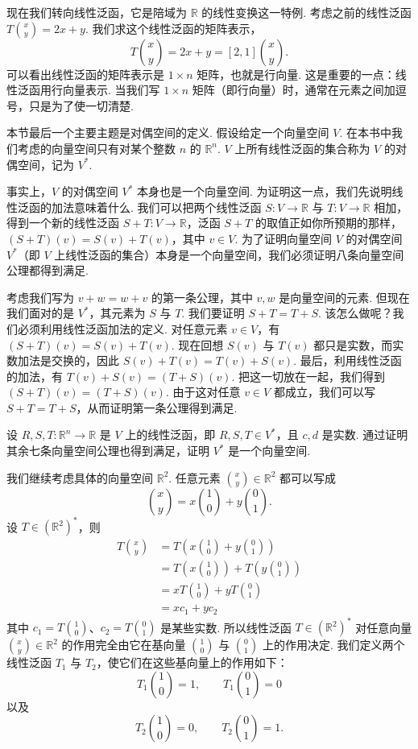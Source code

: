 现在我们转向线性泛函，它是陪域为 $\mathbb{R}$ 的线性变换这一特例. 考虑之前的线性泛函 $T\binom{x}{y}=2x+y$. 我们求这个线性泛函的矩阵表示，
\[
T\binom{x}{y}=2x+y=[2,1]\binom{x}{y}.
\]
可以看出线性泛函的矩阵表示是 $1\times n$ 矩阵，也就是行向量. 这是重要的一点：线性泛函用行向量表示. 当我们写 $1\times n$ 矩阵（即行向量）时，通常在元素之间加逗号，只是为了使一切清楚.

本节最后一个主要主题是对偶空间的定义. 假设给定一个向量空间 $V$. 在本书中我们考虑的向量空间只有对某个整数 $n$ 的 $\mathbb{R}^n$. $V$ 上所有线性泛函的集合称为 $V$ 的对偶空间，记为 $V^*$.

事实上，$V$ 的对偶空间 $V^*$ 本身也是一个向量空间. 为证明这一点，我们先说明线性泛函的加法意味着什么. 我们可以把两个线性泛函 $S:V\to\mathbb{R}$ 与 $T:V\to\mathbb{R}$ 相加，得到一个新的线性泛函 $S+T:V\to\mathbb{R}$，泛函 $S+T$ 的取值正如你所预期的那样，$(S+T)(v)=S(v)+T(v)$，其中 $v\in V$. 为了证明向量空间 $V$ 的对偶空间 $V^*$（即 $V$ 上线性泛函的集合）本身是一个向量空间，我们必须证明八条向量空间公理都得到满足.

考虑我们写为 $v+w=w+v$ 的第一条公理，其中 $v,w$ 是向量空间的元素. 但现在我们面对的是 $V^*$，其元素为 $S$ 与 $T$. 我们要证明 $S+T=T+S$. 该怎么做呢？我们必须利用线性泛函加法的定义. 对任意元素 $v\in V$，有 $(S+T)(v)=S(v)+T(v)$. 现在回想 $S(v)$ 与 $T(v)$ 都只是实数，而实数加法是交换的，因此 $S(v)+T(v)=T(v)+S(v)$. 最后，利用线性泛函的加法，有 $T(v)+S(v)=(T+S)(v)$. 把这一切放在一起，我们得到 $(S+T)(v)=(T+S)(v)$. 由于这对任意 $v\in V$ 都成立，我们可以写 $S+T=T+S$，从而证明第一条公理得到满足.

\begin{question}\label{q:1-7}
设 $R,S,T:\mathbb{R}^n\to\mathbb{R}$ 是 $V$ 上的线性泛函，即 $R,S,T\in V^*$，且 $c,d$ 是实数. 通过证明其余七条向量空间公理也得到满足，证明 $V^*$ 是一个向量空间.
\end{question}

我们继续考虑具体的向量空间 $\mathbb{R}^2$. 任意元素 $\binom{x}{y}\in\mathbb{R}^2$ 都可以写成
\[
\binom{x}{y}=x\binom{1}{0}+y\binom{0}{1}.
\]
设 $T\in(\mathbb{R}^2)^*$，则
\begin{align*}
T\binom{x}{y}
&=T\left(x\binom{1}{0}+y\binom{0}{1}\right)\\
&=T\left(x\binom{1}{0}\right)+T\left(y\binom{0}{1}\right)\\
&=xT\binom{1}{0}+yT\binom{0}{1}\\
&=xc_1+yc_2
\end{align*}
其中 $c_1=T\binom{1}{0}$、$c_2=T\binom{0}{1}$ 是某些实数. 所以线性泛函 $T\in(\mathbb{R}^2)^*$ 对任意向量 $\binom{x}{y}\in\mathbb{R}^2$ 的作用完全由它在基向量 $\binom{1}{0}$ 与 $\binom{0}{1}$ 上的作用决定. 我们定义两个线性泛函 $T_1$ 与 $T_2$，使它们在这些基向量上的作用如下：
\[
T_1\binom{1}{0}=1,\qquad T_1\binom{0}{1}=0
\]
以及
\[
T_2\binom{1}{0}=0,\qquad T_2\binom{0}{1}=1.
\]

